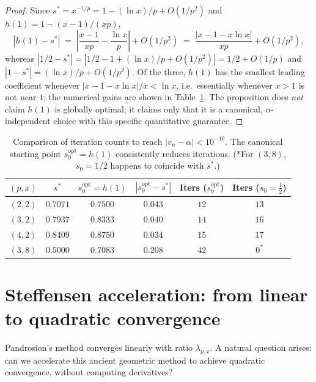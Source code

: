 \documentclass[11pt,a4paper]{article}
\theoremstyle{definition}
\begin{document}
\begin{proof}
Since $s^* = x^{-1/p} = 1 - (\ln x)/p + O(1/p^2)$ and $h(1) = 1 - (x-1)/(xp)$,
\[
  |h(1) - s^*| \;=\; \left|\frac{x-1}{xp} - \frac{\ln x}{p}\right| + O(1/p^2)
  \;=\; \frac{|x - 1 - x\ln x|}{xp} + O(1/p^2),
\]
whereas $|1/2 - s^*| = |1/2 - 1 + (\ln x)/p + O(1/p^2)| = 1/2 + O(1/p)$ and $|1 - s^*| = (\ln x)/p + O(1/p^2)$. Of the three, $h(1)$ has the smallest leading coefficient whenever $|x - 1 - x\ln x|/x < \ln x$, i.e.\ essentially whenever $x > 1$ is not near $1$; the numerical gains are shown in Table~\ref{tab:optimal-start-expo}. The proposition does \emph{not} claim $h(1)$ is globally optimal; it claims only that it is a canonical, $\alpha$-independent choice with this specific quantitative guarantee.
\end{proof}

\begin{table}[h]
\centering
\begin{tabular}{cccccc}
\toprule
$(p,x)$ & $s^*$ & $s_0^{\mathrm{opt}} = h(1)$ & $|s_0^{\mathrm{opt}} - s^*|$ & Iters ($s_0^{\mathrm{opt}}$) & Iters ($s_0 = \tfrac{1}{2}$) \\
\midrule
$(2,2)$ & $0.7071$ & $0.7500$ & $0.043$ & $12$ & $13$ \\
$(3,2)$ & $0.7937$ & $0.8333$ & $0.040$ & $14$ & $16$ \\
$(4,2)$ & $0.8409$ & $0.8750$ & $0.034$ & $15$ & $17$ \\
$(3,8)$ & $0.5000$ & $0.7083$ & $0.208$ & $42$ & $0^*$ \\
\bottomrule
\end{tabular}
\caption{Comparison of iteration counts to reach $|v_n - \alpha| < 10^{-10}$. The canonical starting point $s_0^{\mathrm{opt}} = h(1)$ consistently reduces iterations. (*For $(3,8)$, $s_0 = 1/2$ happens to coincide with $s^*$.)}
\label{tab:optimal-start-expo}
\end{table}

\section{Steffensen acceleration: from linear to quadratic convergence}
\label{sec:steffensen}

Pandrosion's method converges linearly with ratio $\lambda_{p,x}$. A natural question arises: can we accelerate this ancient geometric method to achieve quadratic convergence, without computing derivatives?
\end{document}
